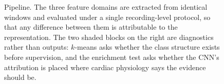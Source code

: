 \begin{figure}[t]
{\begin{tikzpicture}
\end{tikzpicture}}
\caption{Pipeline. The three feature domains are extracted from identical
windows and evaluated under a single recording-level protocol, so that any
difference between them is attributable to the representation. The two shaded
blocks on the right are diagnostics rather than outputs: $k$-means asks whether
the class structure exists before supervision, and the enrichment test asks
whether the CNN's attribution is placed where cardiac physiology says the
evidence should be.}
\label{fig:pipeline}
\end{figure}
